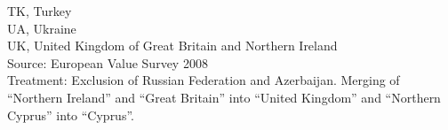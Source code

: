 \documentclass[preprint,12pt,authoryear]{elsarticle}
\begin{document}
		TK, Turkey\\ \noindent\hspace*{20mm}%
		UA, Ukraine\\ \noindent\hspace*{20mm}%
		UK, United Kingdom of Great Britain and Northern Ireland\\ \noindent\hspace*{10mm}%
	Source: European Value Survey 2008\\ \noindent\hspace*{10mm}%
	Treatment: Exclusion of Russian Federation and Azerbaijan. Merging of “Northern Ireland” and “Great Britain” \noindent\hspace*{10mm}%
	into “United Kingdom” and “Northern Cyprus” into “Cyprus”.\\
	
\end{document}
